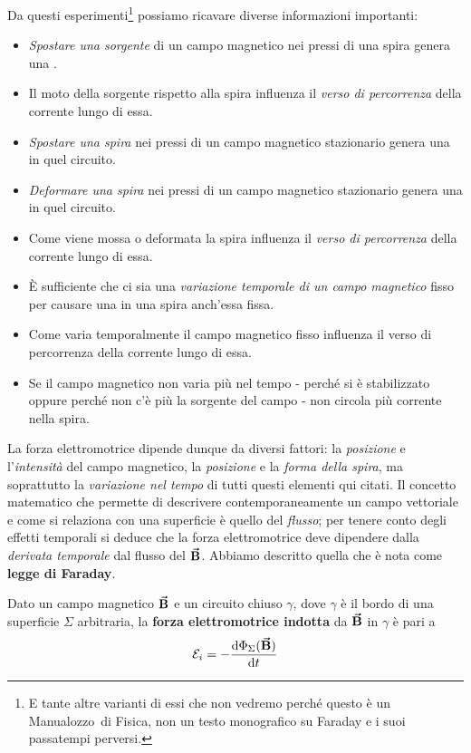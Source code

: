 Da questi esperimenti\footnote{E tante altre varianti di essi che non vedremo perché questo è un Manualozzo\texttrademark\ di Fisica, non un testo monografico su Faraday e i suoi passatempi perversi.} possiamo ricavare diverse informazioni importanti:
\begin{itemize}\label{osservazioniFaraday} %
	\item \textit{Spostare una sorgente} di un campo magnetico nei pressi di una spira genera una \fem.
	\item Il moto della sorgente rispetto alla spira influenza il \textit{verso di percorrenza} della corrente lungo di essa.
	\item \textit{Spostare una spira} nei pressi di un campo magnetico stazionario genera una \fem in quel circuito.
	\item \textit{Deformare una spira} nei pressi di un campo magnetico stazionario genera una \fem in quel circuito.
	\item Come viene mossa o deformata la spira influenza il \textit{verso di percorrenza} della corrente lungo di essa.
	\item È sufficiente che ci sia una \textit{variazione temporale di un campo magnetico} fisso per causare una \fem in una spira anch'essa fissa.
	\item Come varia temporalmente il campo magnetico fisso influenza il verso di percorrenza della corrente lungo di essa.
	\item Se il campo magnetico non varia più nel tempo - perché si è stabilizzato oppure perché non c'è più la sorgente del campo - non circola più corrente nella spira.
\end{itemize}
La forza elettromotrice dipende dunque da diversi fattori: la \textit{posizione} e l'\textit{intensità} del campo magnetico, la \textit{posizione} e la \textit{forma della spira}, ma soprattutto la \textit{variazione nel tempo} di tutti questi elementi qui citati.
Il concetto matematico che permette di descrivere contemporaneamente un campo vettoriale e come si relaziona con una superficie è quello del \textit{flusso}; per tenere conto degli effetti temporali si deduce che la forza elettromotrice deve dipendere dalla \textit{derivata temporale} dal flusso del $\vb*{\va{B}}$. Abbiamo descritto quella che è nota come \textbf{legge di Faraday}.
\begin{theorema}
	Dato un campo magnetico $\vb*{\va{B}}$ e un circuito chiuso $\gamma$, dove $\gamma$ è il bordo di una superficie $\Sigma$ arbitraria, la \textbf{forza elettromotrice indotta} da $\vb*{\va{B}}$ in $\gamma$ è pari a
	\begin{equation}
		\mathcal{E}_i=-\dv{\Phi_\Sigma (\vb*{\va{B}})}{t}
	\end{equation}
\end{theorema}
